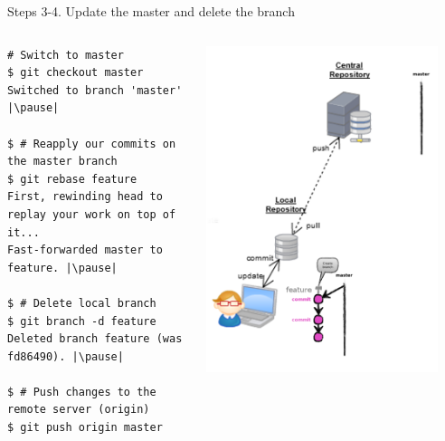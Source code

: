 \begin{frame}[fragile]{Steps 3-4. Update the master and delete the branch}
\begin{columns}
	\begin{column}{0.6\textwidth}
  	\begin{lstlisting}
# Switch to master
$ git checkout master
Switched to branch 'master' |\pause|

$ # Reapply our commits on the master branch
$ git rebase feature
First, rewinding head to replay your work on top of it...
Fast-forwarded master to feature. |\pause|

$ # Delete local branch
$ git branch -d feature
Deleted branch feature (was fd86490). |\pause|

$ # Push changes to the remote server (origin)
$ git push origin master
	\end{lstlisting}
	\end{column}
	\begin{column}{0.4\textwidth}
		\begin{center}
			 {
				\includegraphics[width=0.9\textwidth]{branch_committed.png}
}
\end{center}
\end{column}
\end{columns}
\end{frame}
